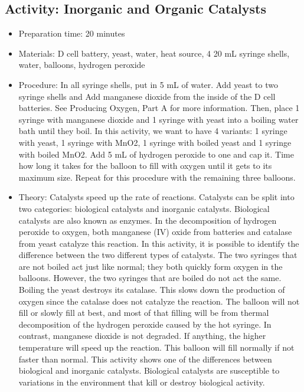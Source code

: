 \begin{itemize}
{\begin{itemize}
\begin{itemize}
{\subsection{Activity: Inorganic and Organic Catalysts}
\begin{itemize}
\item{Preparation time: 20 minutes}
\item{Materials: D cell battery, yeast, water, heat source, 4 20 mL syringe shells, water, balloons, hydrogen peroxide}
\item{Procedure: In all syringe shells, put in 5 mL of water. Add yeast to two syringe shells and Add manganese dioxide from the inside of the D cell batteries. See Producing Oxygen, Part A for more information. Then, place 1 syringe with manganese dioxide and 1 syringe with yeast into a boiling water bath until they boil. In this activity, we want to have 4 variants: 1 syringe with yeast, 1 syringe with MnO2, 1 syringe with boiled yeast and 1 syringe with boiled MnO2. Add 5 mL of hydrogen peroxide to one and cap it. Time how long it takes for the balloon to fill with oxygen until it gets to its maximum size. Repeat for this procedure with the remaining three balloons. }
\item{Theory: Catalysts speed up the rate of reactions. Catalysts can be split into two categories: biological catalysts and inorganic catalysts. Biological catalysts are also known as enzymes. In the decomposition of hydrogen peroxide to oxygen, both manganese (IV) oxide from batteries and catalase from yeast catalyze this reaction. In this activity, it is possible to identify the difference between the two different types of catalysts. The two syringes that are not boiled act just like normal; they both quickly form oxygen in the balloons. However, the two syringes that are boiled do not act the same. Boiling the yeast destroys its catalase. This slows down the production of oxygen since the catalase does not catalyze the reaction. The balloon will not fill or slowly fill at best, and most of that filling will be from thermal decomposition of the hydrogen peroxide caused by the hot syringe. In contrast, manganese dioxide is not degraded. If anything, the higher temperature will speed up the reaction. This balloon will fill normally if not faster than normal. This activity shows one of the differences between biological and inorganic catalysts. Biological catalysts are susceptible to variations in the environment that kill or destroy biological activity.}
\end{itemize}

}
\end{itemize}
\end{itemize}}
\end{itemize}
